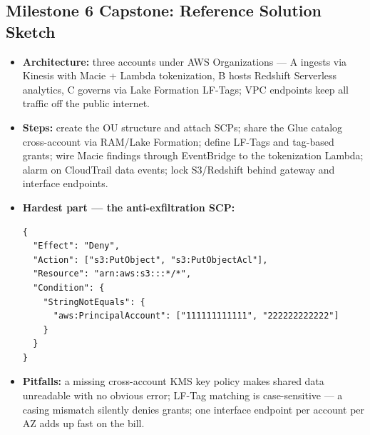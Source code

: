 \documentclass[11pt, a4paper]{article}
\begin{document}
\subsection*{Milestone 6 Capstone: Reference Solution Sketch}
\begin{itemize}[label=-, itemsep=0pt]
    \item \textbf{Architecture:} three accounts under AWS Organizations --- A ingests via Kinesis with Macie + Lambda tokenization, B hosts Redshift Serverless analytics, C governs via Lake Formation LF-Tags; VPC endpoints keep all traffic off the public internet.
    \item \textbf{Steps:} create the OU structure and attach SCPs; share the Glue catalog cross-account via RAM/Lake Formation; define LF-Tags and tag-based grants; wire Macie findings through EventBridge to the tokenization Lambda; alarm on CloudTrail data events; lock S3/Redshift behind gateway and interface endpoints.
    \item \textbf{Hardest part --- the anti-exfiltration SCP:}
\begin{lstlisting}
{
  "Effect": "Deny",
  "Action": ["s3:PutObject", "s3:PutObjectAcl"],
  "Resource": "arn:aws:s3:::*/*",
  "Condition": {
    "StringNotEquals": {
      "aws:PrincipalAccount": ["111111111111", "222222222222"]
    }
  }
}
\end{lstlisting}
    \item \textbf{Pitfalls:} a missing cross-account KMS key policy makes shared data unreadable with no obvious error; LF-Tag matching is case-sensitive --- a casing mismatch silently denies grants; one interface endpoint per account per AZ adds up fast on the bill.
\end{itemize}
\end{document}
